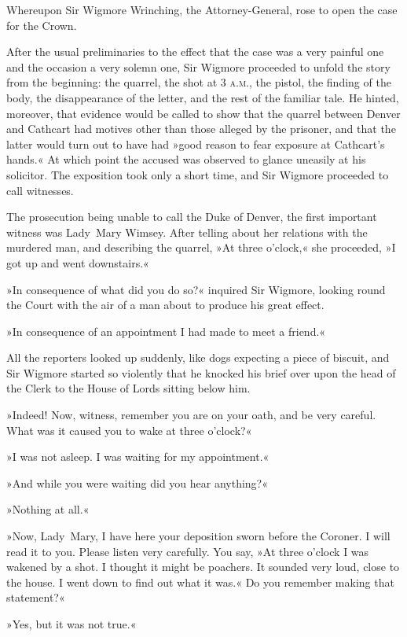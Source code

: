 Whereupon Sir Wigmore Wrinching, the Attorney-General, rose to open the case for the Crown.

After the usual preliminaries to the effect that the case was a very painful one and the occasion a very solemn one, Sir Wigmore proceeded to unfold the story from the beginning: the quarrel, the shot at 3 \textsc{a.m.}, the pistol, the finding of the body, the disappearance of the letter, and the rest of the familiar tale. He hinted, moreover, that evidence would be called to show that the quarrel between Denver and Cathcart had motives other than those alleged by the prisoner, and that the latter would turn out to have had »good reason to fear exposure at Cathcart's hands.« At which point the accused was observed to glance uneasily at his solicitor. The exposition took only a short time, and Sir Wigmore proceeded to call witnesses.

The prosecution being unable to call the Duke of Denver, the first important witness was Lady~Mary Wimsey. After telling about her relations with the murdered man, and describing the quarrel, »At three o'clock,« she proceeded, »I got up and went downstairs.«

»In consequence of what did you do so?« inquired Sir Wigmore, looking round the Court with the air of a man about to produce his great effect.

»In consequence of an appointment I had made to meet a friend.«

All the reporters looked up suddenly, like dogs expecting a piece of biscuit, and Sir Wigmore started so violently that he knocked his brief over upon the head of the Clerk to the House of Lords sitting below him.

»Indeed! Now, witness, remember you are on your oath, and be very careful. What was it caused you to wake at three o'clock?«

»I was not asleep. I was waiting for my appointment.«

»And while you were waiting did you hear anything?«

»Nothing at all.«

»Now, Lady~Mary, I have here your deposition sworn before the Coroner.  I will read it to you. Please listen very carefully. You say, »At three o'clock I was wakened by a shot. I thought it might be poachers. It sounded very loud, close to the house. I went down to find out what it was.« Do you remember making that statement?«

»Yes, but it was not true.«

